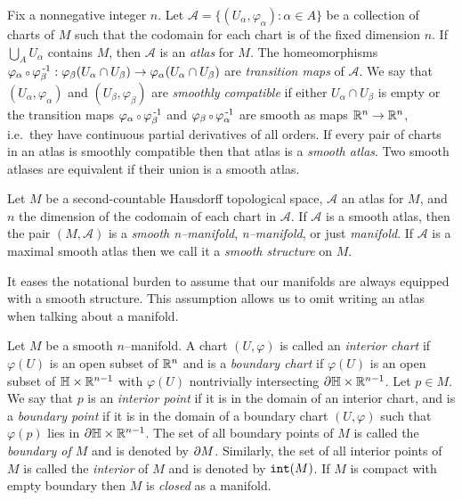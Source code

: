 \begin{defn}[Atlas]
	\label{def:atlas}
	Fix a nonnegative integer $n$.
	Let $\mathcal{A}=\{(U_\alpha,\varphi_\alpha):\alpha\in A\}$ be a collection of charts of $M$ such that the codomain for each chart is of the fixed dimension $n$.
	If $\bigcup_A U_\alpha$ contains $M$, then $\mathcal{A}$ is an \emph{atlas} for $M$.
	The homeomorphisms $\varphi_\alpha\comp \varphi_\beta\inv:\varphi_\beta(U_\alpha\cap U_\beta)\to \varphi_\alpha(U_\alpha\cap U_\beta)$ are \emph{transition maps} of $\mathcal{A}$.
	We say that $(U_\alpha,\varphi_\alpha)$ and $(U_\beta,\varphi_\beta)$ are \emph{smoothly compatible} if either $U_\alpha\cap U_\beta$ is empty or the transition maps $\varphi_\alpha\comp \varphi_\beta\inv$ and $\varphi_\beta\comp \varphi_\alpha\inv$ are smooth as maps $\mathbb{R}^n\to\mathbb{R}^n$, i.e.\ they have continuous partial derivatives of all orders.
	If every pair of charts in an atlas is smoothly compatible then that atlas is a \emph{smooth atlas}.
	Two smooth atlases are equivalent if their union is a smooth atlas.
\end{defn}

\begin{defn}[Manifold]
	\label{def:manifold}
	Let $M$ be a second-countable Hausdorff topological space, $\mathcal{A}$ an atlas for $M$, and $n$ the dimension of the codomain of each chart in $\mathcal{A}$.
	If $\mathcal{A}$ is a smooth atlas, then the pair $(M,\mathcal{A})$ is a \emph{smooth n--manifold},  \emph{n--manifold}, or just \emph{manifold}.
	If $\mathcal{A}$ is a maximal smooth atlas then we call it a \emph{smooth structure} on $M$.
\end{defn}

It eases the notational burden to assume that our manifolds are always equipped with a smooth structure.
This assumption allows us to omit writing an atlas when talking about a manifold.
	
\begin{defn}[Boundary]
	\label{def:boundary}
	Let $M$ be a smooth $n$--manifold.
	A chart $(U,\varphi)$ is called an \emph{interior chart} if $\varphi(U)$ is an open subset of $\mathbb{R}^n$ and is a \emph{boundary chart} if $\varphi(U)$ is an open subset of $\mathbb{H}\times\mathbb{R}^{n-1}$ with $\varphi(U)$ nontrivially intersecting $\partial \mathbb{H}\times\mathbb{R}^{n-1}$.
	Let $p\in M$.
	We say that $p$ is an \emph{interior point} if it is in the domain of an interior chart, and is a \emph{boundary point} if it is in the domain of a boundary chart $(U,\varphi)$ such that $\varphi(p)$ lies in $\partial\mathbb{H}\times\mathbb{R}^{n-1}$.
	The set of all boundary points of $M$ is called the \emph{boundary of $M$} and is denoted by $\partial M$.
	Similarly, the set of all interior points of $M$ is called the \emph{interior} of $M$ and is denoted by $\mathtt{int}(M)$.
	If $M$ is compact with empty boundary then $M$ is \emph{closed} as a manifold.
\end{defn}

